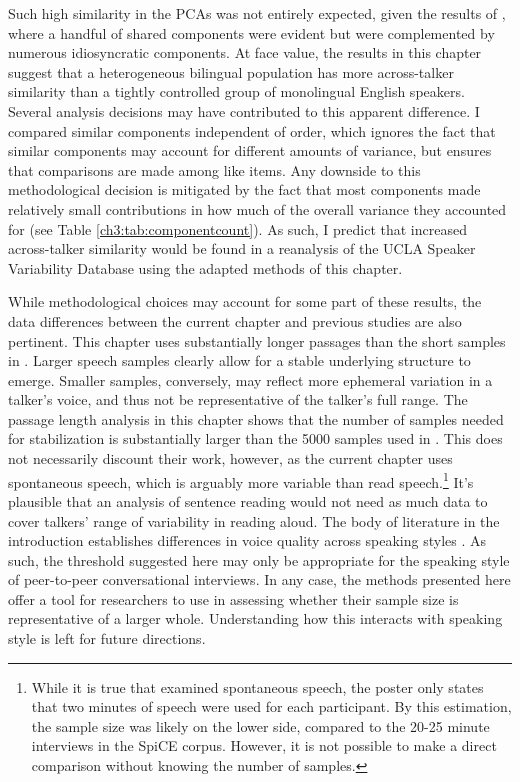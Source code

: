Such high similarity in the PCAs was not entirely expected, given the results of \citet{lee_2019_acoustic}, where a handful of shared components were evident but were complemented by numerous idiosyncratic components. At face value, the results in this chapter suggest that a heterogeneous bilingual population has more across-talker similarity than a tightly controlled group of monolingual English speakers. Several analysis decisions may have contributed to this apparent difference. I compared similar components independent of order, which ignores the fact that similar components may account for different amounts of variance, but ensures that comparisons are made among like items. Any downside to this methodological decision is mitigated by the fact that most components made relatively small contributions in how much of the overall variance they accounted for (see Table \ref{ch3:tab:componentcount}). As such, I predict that increased across-talker similarity would be found in a reanalysis of the UCLA Speaker Variability Database \citep{keating_2019_database} using the adapted methods of this chapter. 

While methodological choices may account for some part of these results, the data differences between the current chapter and previous studies are also pertinent. This chapter uses substantially longer passages than the short samples in \citet{lee_2019_acoustic}. Larger speech samples clearly allow for a stable underlying structure to emerge. Smaller samples, conversely, may reflect more ephemeral variation in a talker's voice, and thus not be representative of the talker's full range. The passage length analysis in this chapter shows that the number of samples needed for stabilization is substantially larger than the 5000 samples used in \citet{lee_2019_acoustic}. This does not necessarily discount their work, however, as the current chapter uses spontaneous speech, which is arguably more variable than read speech.\footnote{While it is true that \citet{} examined spontaneous speech, the poster only states that two minutes of speech were used for each participant. By this estimation, the sample size was likely on the lower side, compared to the 20-25 minute interviews in the SpiCE corpus. However, it is not possible to make a direct comparison without knowing the number of samples.} It's plausible that an analysis of sentence reading would not need as much data to cover talkers' range of variability in reading aloud. The body of literature in the introduction establishes differences in voice quality across speaking styles \citep[e.g.,][]{lee_2017_bilingual}. As such, the threshold suggested here may only be appropriate for the speaking style of peer-to-peer conversational interviews. In any case, the methods presented here offer a tool for researchers to use in assessing whether their sample size is representative of a larger whole. Understanding how this interacts with speaking style is left for future directions. 

